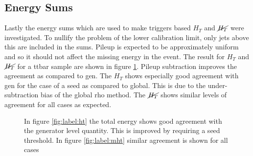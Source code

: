 \subsection{Energy Sums}
Lastly the energy sums which are used to make triggers based $H_T$ and $\cancel{H_T}$ were investigated. To nullify the problem of the lower calibration limit, only jets above this are included in the sums. Pileup is expected to be approximately uniform and so it should not affect the missing energy in the event. The result for $H_T$ and $\cancel{H_T}$ for a ttbar sample are shown in figure \ref{fig:label:sums}. Pileup subtraction improves the agreement as compared to gen.  The $H_T$ shows especially good agreement with gen for the case of a seed as compared to global. This is due to the under-subtraction bias of the global rho method. The $\cancel{H_T}$ shows similar levels of agreement for all cases as expected. 
\begin{figure}
\hfill
{}
\hfill
{}
\caption{In figure \ref{fig:label:ht} the total energy shows good agreement with the generator level quantity. This is improved by requiring a seed threshold. In figure \ref{fig:label:mht} similar agreement is shown for all cases}
\label{fig:label:sums}
\end{figure}
